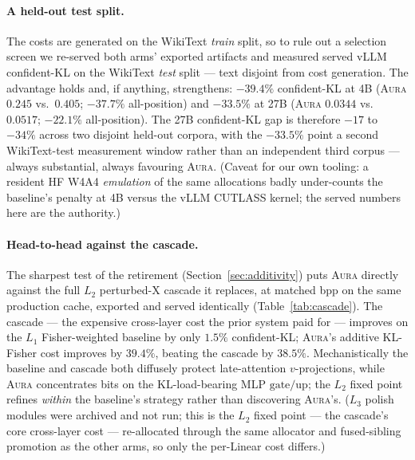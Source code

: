 \documentclass[11pt]{article}
\theoremstyle{plain}
\theoremstyle{definition}
\begin{document}
\paragraph{A held-out test split.} The costs are generated on the WikiText
\emph{train} split, so to rule out a selection screen we re-served both arms'
exported artifacts and measured served vLLM confident-KL on the WikiText
\emph{test} split --- text disjoint from cost generation. The advantage holds
and, if anything, strengthens: $\mathbf{-39.4\%}$ confident-KL at 4B
(\textsc{Aura} $0.245$ vs.\ $0.405$; $-37.7\%$ all-position) and
$\mathbf{-33.5\%}$ at 27B (\textsc{Aura} $0.0344$ vs.\ $0.0517$; $-22.1\%$
all-position). The 27B confident-KL gap is therefore $-17$ to $-34\%$ across
two disjoint held-out corpora, with the $-33.5\%$ point a second WikiText-test
measurement window rather than an independent third corpus --- always
substantial, always favouring \textsc{Aura}. (Caveat for our own tooling: a
resident HF W4A4 \emph{emulation}
of the same allocations badly under-counts the baseline's penalty at 4B versus
the vLLM CUTLASS kernel; the served numbers here are the authority.)

\paragraph{Head-to-head against the cascade.} The sharpest test of the retirement
(Section~\ref{sec:additivity}) puts \textsc{Aura} directly against the full $L_2$
perturbed-X cascade it replaces, at matched bpp on the same production cache,
exported and served identically (Table~\ref{tab:cascade}). The cascade --- the
expensive cross-layer cost the prior system paid for --- improves on the $L_1$
Fisher-weighted baseline by only $1.5\%$ confident-KL; \textsc{Aura}'s additive
KL-Fisher cost improves by $39.4\%$, beating the cascade by $38.5\%$.
Mechanistically the baseline and cascade both diffusely protect late-attention
$v$-projections, while \textsc{Aura} concentrates bits on the KL-load-bearing MLP
$\mathrm{gate}/\mathrm{up}$; the $L_2$ fixed point refines \emph{within} the
baseline's strategy rather than discovering \textsc{Aura}'s. ($L_3$ polish modules
were archived and not run; this is the $L_2$ fixed point --- the cascade's core
cross-layer cost --- re-allocated through the same allocator and fused-sibling
promotion as the other arms, so only the per-Linear cost differs.)
\end{document}
